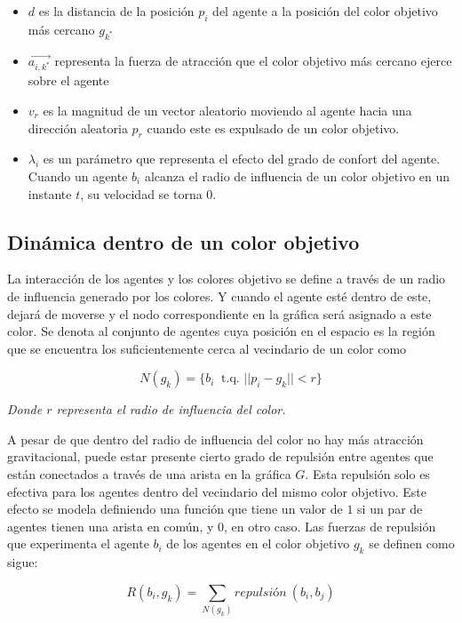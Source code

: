 \documentclass[a4paper]{report}
\begin{document}
\begin{itemize}
\item $d$ es la distancia de la posici\'on $p_i$ del agente a la posici\'on del color
  objetivo m\'as cercano $g_{k^*}$
\item $\vec{a_{i, k^*}}$ representa la fuerza de atracci\'on que el color objetivo
  m\'as cercano ejerce sobre el agente
\item $v_r$ es la magnitud de un vector aleatorio moviendo al agente hacia una
  direcci\'on aleatoria $p_r$ cuando este es expulsado de un color objetivo.
\item $\lambda_i$ es un par\'ametro que representa el efecto del grado de
  confort del agente. Cuando un agente $b_i$ alcanza el radio de influencia de
  un color objetivo en un instante $t$, su velocidad se torna 0.
\end{itemize}

\subsection{Din\'amica dentro de un color objetivo}

La interacci\'on de los agentes y los colores objetivo se define a trav\'es de un
radio de influencia generado por los colores. Y cuando el agente est\'e dentro
de este, dejar\'a de moverse y el nodo correspondiente en la gr\'afica ser\'a
asignado a este color. Se denota al conjunto de agentes cuya posici\'on en el
espacio es la regi\'on que se encuentra los suficientemente cerca al vecindario
de un color como

\[N(g_k) = \{b_i \ \text{ t.q. } ||p_i - g_k|| < \textit{r}\}\]
\begin{center}
  \tiny{\textit{Donde $r$ representa el radio de influencia del color.}}
\end{center}

A pesar de que dentro del radio de influencia del color no hay m\'as atracci\'on
gravitacional, puede estar presente cierto grado de repulsi\'on entre agentes
que est\'an conectados a trav\'es de una arista en la gr\'afica $G$. Esta
repulsi\'on solo es efectiva para los agentes dentro del vecindario del mismo
color objetivo. Este efecto se modela definiendo una funci\'on que tiene
un valor de $1$ si un par de agentes tienen una arista en com\'un, y 0, en
otro caso. Las fuerzas de repulsi\'on que experimenta el agente $b_i$ de los
agentes en el color objetivo $g_k$ se definen como sigue:

\[R(b_i, g_k) = \sum_{N(g_k)} \textit{repulsi\'on} \ (b_i, b_j)\]
\end{document}
